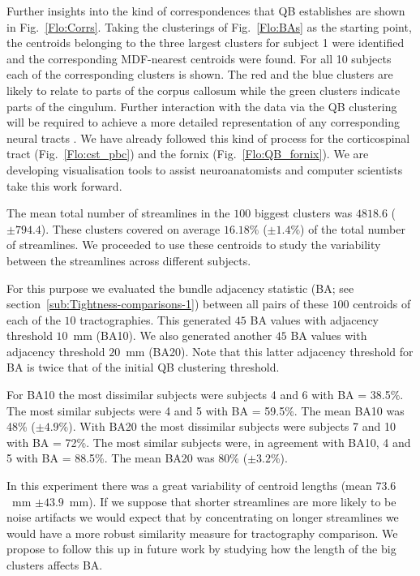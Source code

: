 \documentclass{bioinfo}
\begin{document}
Further insights into the kind of correspondences that QB establishes
are shown in Fig.~\ref{Flo:Corrs}. Taking the clusterings of
Fig.~\ref{Flo:BAs} as the starting point, the centroids belonging to the
three largest clusters for subject 1 were identified and the
corresponding MDF-nearest centroids were found. For all 10 subjects each
of the corresponding clusters is shown. The red and the blue clusters
are likely to relate to parts of the corpus callosum while the green
clusters indicate parts of the cingulum. Further interaction with the
data via the QB clustering will be required to achieve a more detailed
representation of any corresponding neural tracts . We have already
followed this kind of process for the corticospinal tract
(Fig.~\ref{Flo:cst_pbc}) and the fornix (Fig.~\ref{Flo:QB_fornix}). We
are developing visualisation tools to assist neuroanatomists and
computer scientists take this work forward.

The mean total number of streamlines in the $100$ biggest clusters was
$\num{4818.6}$ ($\pm \num{794.4}$). These clusters covered on average
$16.18\%$ ($\pm\num{1.4}\%$) of the total number of streamlines. We
proceeded to use these centroids to study the variability between the
streamlines across different subjects.

For this purpose we evaluated the bundle adjacency statistic (BA; see
section~\ref{sub:Tightness-comparisons-1}) between all pairs of these
$100$ centroids of each of the $10$ tractographies. This generated $45$
BA values with adjacency threshold $10$~mm (BA10). We also generated
another $45$ BA values with adjacency threshold $20$~mm (BA20). Note
that this latter adjacency threshold for BA is twice that of the initial
QB clustering threshold.

For BA10 the most dissimilar subjects were subjects 4 and 6 with BA =
38.5\%. The most similar subjects were 4 and 5 with BA = 59.5\%. The
mean BA10 was 48\% ($\pm\num{4.9}$\%). With BA20 the most dissimilar
subjects were subjects 7 and 10 with BA = 72\%. The most similar
subjects were, in agreement with BA10, 4 and 5 with BA = 88.5\%. The
mean BA20 was 80\% ($\pm\num{3.2}$\%).

In this experiment there was a great variability of centroid lengths
(mean $73.6$~mm $\pm\num{43.9}$~mm). If we suppose that shorter
streamlines are more likely to be noise artifacts we would expect that
by concentrating on longer streamlines we would have a more robust
similarity measure for tractography comparison. We propose to follow
this up in future work by studying how the length of the big clusters
affects BA.
\end{document}
